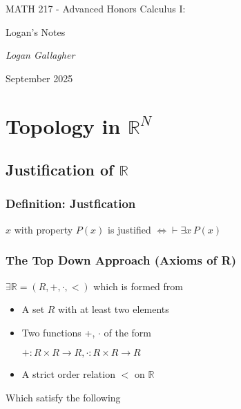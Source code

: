 \documentclass[twocolumn]{book}
\begin{document}

\begin{titlepage}
    \centering
    \vspace*{4cm}
    
    {\Huge MATH 217 - Advanced Honors Calculus I: \par}
    \vspace{0.5cm}

    {\Huge Logan's Notes \par}
    \vspace{0.5cm}

    {\itshape Logan Gallagher}
    \vspace{0.5cm} 
    
    {\large September 2025 \par}
\end{titlepage}




\chapter{Topology in $\mathbb{R}^N$}

\section{Justification of $\mathbb{R}$}
\subsection{Definition: Justfication}
$x$ with property $P(x)$ is justified $\iff \vdash \exists x \, P(x)$

\subsection{The Top Down Approach (Axioms of R)}
$\exists \mathbb{R} = (R,+,\cdot,<)$ which is formed from 
\begin{itemize}
    \item A set $R$ with at least two elements
    \item Two functions +, $\cdot$ of the form

    $+: R \times R \rightarrow R, \cdot : R \times R \rightarrow R$
    \item A strict order relation $<$ on $\mathbb{R}$

\end{itemize}
Which satisfy the following
\end{document}

